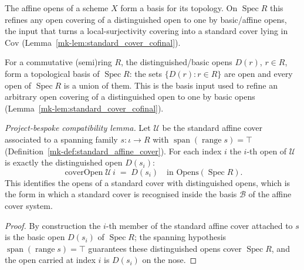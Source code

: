 \begin{lemma}
  \label{mk-lem:scheme_isBasis_affineOpens}
  \mathlibok

  The affine opens of a scheme \(X\) form a basis for its topology. On \(\operatorname{Spec} R\) this
  refines any open covering of a distinguished open to one by basic/affine opens, the input that
  turns a local-surjectivity covering into a standard cover lying in \(\mathrm{Cov}\)
  (Lemma~\ref{mk-lem:standard_cover_cofinal}).
\end{lemma}

\begin{lemma}
  \label{mk-lem:primeSpectrum_isBasis_basicOpen}
  \mathlibok

  For a commutative (semi)ring \(R\), the distinguished/basic opens \(D(r)\), \(r \in R\), form a
  topological basis of \(\operatorname{Spec} R\): the sets \(\{D(r) : r \in R\}\) are open and every
  open of \(\operatorname{Spec} R\) is a union of them. This is the basis input used to refine an
  arbitrary open covering of a distinguished open to one by basic opens
  (Lemma~\ref{mk-lem:standard_cover_cofinal}).
\end{lemma}

\begin{lemma}\label{mk-lem:cover_datum_bridge}
  \leanok

  \textit{Project-bespoke compatibility lemma.}
  Let \(\mathcal{U}\) be the standard affine cover associated to a spanning family
  \(s : \iota \to R\) with \(\operatorname{span}(\operatorname{range} s) = \top\)
  (Definition~\ref{mk-def:standard_affine_cover}). For each index \(i\) the \(i\)-th open of
  \(\mathcal{U}\) is exactly the distinguished open \(D(s_i)\):
  \[
    \operatorname{coverOpen} \mathcal{U}\, i \;=\; D(s_i)
    \quad\text{in } \mathrm{Opens}(\operatorname{Spec} R).
  \]
  This identifies the opens of a standard cover with distinguished opens, which is the form in
  which a standard cover is recognised inside the basis \(\mathcal{B}\) of the affine cover system.
\end{lemma}
\begin{proof}
  \leanok
  By construction the \(i\)-th member of the standard affine cover attached to \(s\) is the basic
  open \(D(s_i)\) of \(\operatorname{Spec} R\); the spanning hypothesis
  \(\operatorname{span}(\operatorname{range} s) = \top\) guarantees these distinguished opens cover
  \(\operatorname{Spec} R\), and the open carried at index \(i\) is \(D(s_i)\) on the nose.
\end{proof}

